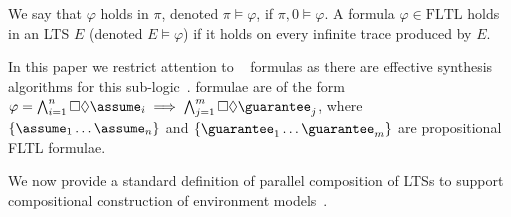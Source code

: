 We say that $\varphi$ holds in $\pi$, denoted $\pi\models\varphi$, if $\pi,0\models\varphi$. 
A formula $\varphi \in \mbox{FLTL}$ holds in an LTS $E$ (denoted $E \models \varphi$) if it holds on every infinite trace produced by $E$.

In this paper we restrict attention to \gr~\cite{DBLP:journals/jcss/BloemJPPS12} formulas as there are effective synthesis algorithms for this sub-logic~\cite{DBLP:journals/jcss/BloemJPPS12}. \gr formulae are of the form $\varphi = \bigwedge_{i=1}^n \square\Diamond \assume_i \implies \bigwedge_{j=1}^m \square\Diamond \guarantee_j$, where $\{\assume_1 \ldots \assume_n\}$ and $\{\guarantee_1 \ldots \guarantee_m\}$ are propositional FLTL formulae.



We now provide a standard definition of parallel composition of LTSs to support compositional construction of environment models~\cite{DBLP:journals/cacm/Hoare78}.



